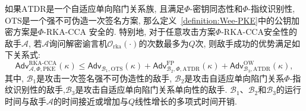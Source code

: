 \begin{theorem}\label{theorem:Wee-PKE}
如果$\text{ATDR}$是一个自适应单向陷门关系族, 且满足$\Phi$-密钥同态性和$\Phi$-指纹识别性, $\text{OTS}$是一个强不可伪造一次签名方案, 那么定义~\ref{definition:Wee-PKE}中的公钥加密方案是$\Phi$-RKA-CCA
安全的. 特别地, 对于任意攻击方案$\Phi$-RKA-CCA安全性的敌手$\mathcal{A}$, 若$\mathcal{A}$询问解密谕言机$\mathcal{O}_{\text{rka}}(\cdot)$的次数最多为$Q$次, 则敌手成功的优势满足如下关系式:
\[
\mathsf{Adv}_{\mathcal{A}, \Phi, \text{PKE}}^{\text{RKA-CCA}}(\kappa) \leq  \mathsf{Adv}_{\mathcal{B}_1, \text{OTS}}(\kappa) + \mathsf{Adv}_{\mathcal{B}_2, \Phi, \text{ATDR}}^{\text{FP}}(\kappa) + \mathsf{Adv}_{\mathcal{B}_3, \text{ATDR}}^{\text{OW}}(\kappa), 
\]
其中, $\mathcal{B}_1$是攻击一次签名强不可伪造性的敌手, $\mathcal{B}_2$是攻击自适应单向陷门关系$\Phi$-指纹识别性的敌手,$\mathcal{B}_3$是攻击自适应单向陷门关系单向性的敌手.  $\mathcal{B}_1$、$\mathcal{B}_2$和$\mathcal{B}_3$的运行时间与敌手$\mathcal{A}$的时间接近或增加与$Q$线性增长的多项式时间开销.
\end{theorem}

